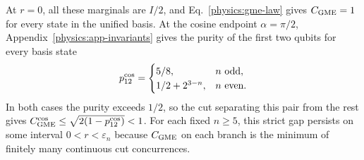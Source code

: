 At $r=0$, all these marginals are $I/2$, and Eq.~\eqref{physics:gme-law} gives $C_{\rm GME}=1$ for every state in the unified basis. At the cosine endpoint $\alpha=\pi/2$, Appendix~\ref{physics:app-invariants} gives the purity of the first two qubits for every basis state
\[
 p_{12}^{\rm cos}=
 \begin{cases}
  5/8, & n\ \text{odd},\\
  1/2+2^{3-n}, & n\ \text{even}.
 \end{cases}
\]
In both cases the purity exceeds $1/2$, so the cut separating this pair from the rest gives $C_{\rm GME}^{\rm cos}\le\sqrt{2(1-p_{12}^{\rm cos})}<1$. For each fixed $n\ge5$, this strict gap persists on some interval $0<r<\varepsilon_n$ because $C_{\rm GME}$ on each branch is the minimum of finitely many continuous cut concurrences.
